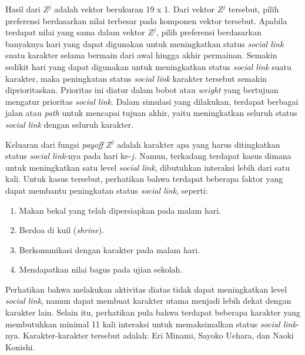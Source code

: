 Hasil dari $Z^{j}$ adalah vektor berukuran 19 x 1. Dari vektor $Z^{j}$ tersebut, pilih preferensi berdasarkan nilai terbesar pada komponen vektor tersebut. Apabila terdapat nilai yang sama dalam vektor $Z^{j}$, pilih preferensi berdasarkan banyaknya hari yang dapat digunakan untuk meningkatkan status \textit{social link} suatu karakter selama bermain dari awal hingga akhir permainan. Semakin sedikit hari yang dapat digunakan untuk meningkatkan status \textit{social link} suatu karakter, maka peningkatan status \textit{social link} karakter tersebut semakin diprioritaskan. Prioritas ini diatur dalam bobot atau \textit{weight} yang bertujuan mengatur prioritas \textit{social link}. Dalam simulasi yang dilakukan, terdapat berbagai jalan atau \textit{path} untuk mencapai tujuan akhir, yaitu meningkatkan seluruh status \textit{social link} dengan seluruh karakter.

Keluaran dari fungsi \textit{payoff} $Z^{j}$ adalah karakter apa yang harus ditingkatkan status \textit{social link}-nya pada hari ke-$j$. Namun, terkadang terdapat kasus dimana untuk meningkatkan satu level \textit{social link}, dibutuhkan interaksi lebih dari satu kali. Untuk kasus tersebut, perhatikan bahwa terdapat beberapa faktor yang dapat membantu peningkatan status \textit{social link}, seperti:
\begin{enumerate}
    \item Makan bekal yang telah dipersiapkan pada malam hari.
    \item Berdoa di kuil (\textit{shrine}).
    \item Berkomunikasi dengan karakter pada malam hari.
    \item Mendapatkan nilai bagus pada ujian sekolah.
\end{enumerate}

Perhatikan bahwa melakukan aktivitas diatas tidak dapat meningkatkan level \textit{social link}, namun dapat membuat karakter utama menjadi lebih dekat dengan karakter lain. Selain itu, perhatikan pula bahwa terdapat beberapa karakter yang membutuhkan minimal 11 kali interaksi untuk memaksimalkan status \textit{social link}-nya. Karakter-karakter tersebut adalah: Eri Minami, Sayoko Uehara, dan Naoki Konishi.

